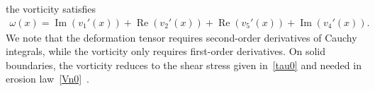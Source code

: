 \documentclass[3p]{elsarticle}
\renewcommand{\Re}{{\operatorname{Re}}}
\renewcommand{\Im}{{\operatorname{Im}}}
\newcommand{\pderiv}[2]{\frac{\partial #1}{\partial #2}}
\begin{document}
\begin{appendices}
the vorticity satisfies~\cite{chiu2020viscous}
\begin{align}
  \omega(x) = \Im(v_1'(x)) + \Re(v_2'(x)) + \Re(v_5'(x)) + \Im(v_4'(x)).
  \label{eqn:vorticityCauchy}
\end{align}
We note that the deformation tensor requires second-order derivatives of
Cauchy integrals, while the vorticity only requires first-order
derivatives. On solid boundaries, the vorticity reduces to the shear
stress given in~\eqref{tau0} and needed in erosion
law~\eqref{Vn0}~\cite{quaife2018boundary, chiu2020viscous}.


\end{appendices}
\end{document}
